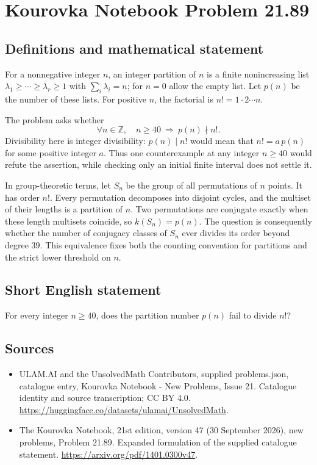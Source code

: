 \documentclass[11pt,a4paper]{article}
\begin{document}
\section*{Kourovka Notebook Problem 21.89}\label{statement}

\subsection{Definitions and mathematical statement}
For a nonnegative integer $n$, an integer partition of $n$ is a finite nonincreasing list $\lambda_1\ge\cdots\ge\lambda_r\ge1$ with $\sum_i\lambda_i=n$; for $n=0$ allow the empty list. Let $p(n)$ be the number of these lists. For positive $n$, the factorial is $n!=1\cdot2\cdots n$.

The problem asks whether
\[
 \forall n\in\mathbb Z,\quad n\ge40\ \Longrightarrow\ p(n)\nmid n!.
\]
Divisibility here is integer divisibility: $p(n)\mid n!$ would mean that $n!=a\,p(n)$ for some positive integer $a$. Thus one counterexample at any integer $n\ge40$ would refute the assertion, while checking only an initial finite interval does not settle it.

In group-theoretic terms, let $S_n$ be the group of all permutations of $n$ points. It has order $n!$. Every permutation decomposes into disjoint cycles, and the multiset of their lengths is a partition of $n$. Two permutations are conjugate exactly when these length multisets coincide, so $k(S_n)=p(n)$. The question is consequently whether the number of conjugacy classes of $S_n$ ever divides its order beyond degree $39$. This equivalence fixes both the counting convention for partitions and the strict lower threshold on $n$.
\subsection{Short English statement}
For every integer $n\ge40$, does the partition number $p(n)$ fail to divide $n!$?
\subsection{Sources}
\begin{itemize}
\item[S1] ULAM.AI and the UnsolvedMath Contributors, supplied problems.json, catalogue entry, Kourovka Notebook - New Problems, Issue 21. Catalogue identity and source transcription; CC BY 4.0.
\url{https://huggingface.co/datasets/ulamai/UnsolvedMath}.
\item[S2] The Kourovka Notebook, 21st edition, version 47 (30 September 2026), new problems, Problem 21.89. Expanded formulation of the supplied catalogue statement.
\url{https://arxiv.org/pdf/1401.0300v47}.
\end{itemize}
\end{document}
